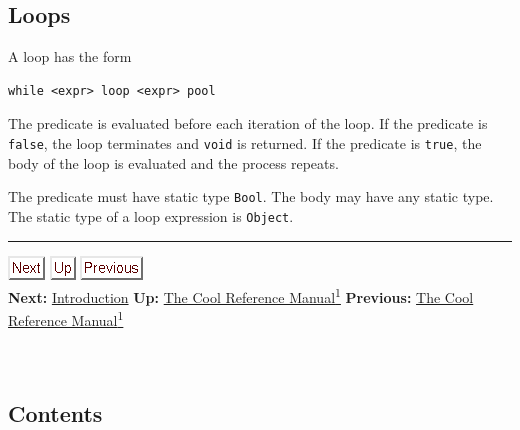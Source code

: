 \documentclass[]{article}
\begin{document}
\subsection{Loops}

A loop has the form

\begin{verbatim}
while <expr> loop <expr> pool
\end{verbatim}

The predicate is evaluated before each iteration of the loop. If the
predicate is \texttt{false}, the loop terminates and \texttt{void} is
returned. If the predicate is \texttt{true}, the body of the loop is
evaluated and the process repeats.

The predicate must have static type \texttt{Bool}. The body may have any
static type. The static type of a loop expression is \texttt{Object}.

\begin{center}\rule{3in}{0.4pt}\end{center}

\href{node2.html}{\includegraphics{next.png}}
\href{cool-manual.html}{\includegraphics{up.png}}
\href{cool-manual.html}{\includegraphics{prev.png}} \\ \textbf{Next:}
\href{node2.html}{Introduction} \textbf{Up:} \href{cool-manual.html}{The
Cool Reference Manual\textsuperscript{1}} \textbf{Previous:}
\href{cool-manual.html}{The Cool Reference Manual\textsuperscript{1}} \\
\\ \\

\subsection{Contents}
\end{document}
